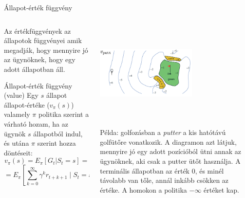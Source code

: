 \documentclass[english, aspectratio=169]{beamer}
\makeatletter
\let\origtableofcontents=\tableofcontents
\def\tableofcontents{\@ifnextchar[{\origtableofcontents}{\gobbletableofcontents}}
\def\gobbletableofcontents#1{\origtableofcontents}
\makeatother
\begin{document}
\begin{frame}
\tableofcontents[currentsection]
\end{frame}

\begin{frame}{Állapot-érték függvény}
\begin{columns}
\begin{column}{.5\textwidth}
Az értékfüggvények az állapotok függvényei amik megadják, hogy mennyire jó az ügynöknek, hogy egy adott állapotban áll.
\begin{block}{Állapot-érték függvény (value)}
Egy $s$ állapot állapot-értéke ($v_{\pi}(s)$) valamely $\pi$ politika szerint a várható hozam, ha az ügynök $s$ állapotból indul, és utána $\pi$ szerint hozza döntéseit:\\
\[
v_{\pi}(s)=E_{\pi}\left[G_{t}|S_{t}=s\right]=
\]
\[
=E_{\pi}\left[\sum_{k=0}^{\infty}\gamma^{k}r_{t+k+1}\mid S_{t}=s\right]
\]
\end{block}
\end{column}
\begin{column}{.5\textwidth}
\begin{center}
\includegraphics[width=5cm, height=5cm, keepaspectratio]{images/reinf_9.png}
\end{center}
\begin{small}
Példa: golfozásban a \emph{putter} a kis hatótávú golfütőre vonatkozik. A diagramon azt látjuk, mennyire jó egy adott pozícióból ütni annak az ügynöknek, aki csak a putter ütőt használja. A terminális állapotban az érték $0$, és minél távolabb van tőle, annál inkább csökken az értéke. A homokon a politika $-\infty$ értéket kap.
\end{small}
\end{column}
\end{columns}
\end{frame}
\end{document}
